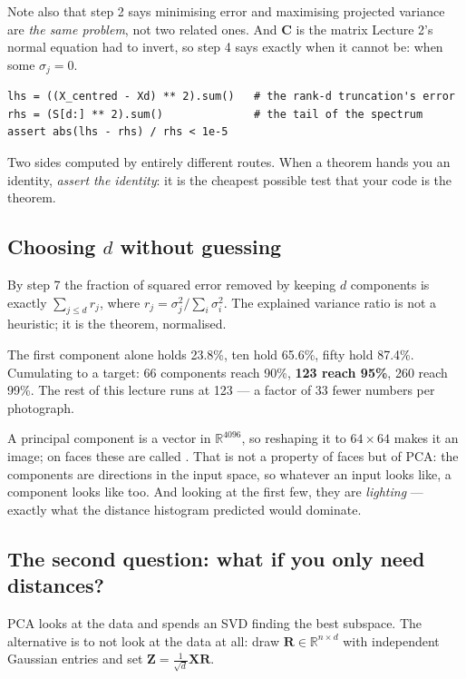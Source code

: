 \documentclass[11pt,a4paper]{article}
\begin{document}
Note also that step 2 says minimising error and maximising projected variance
are \emph{the same problem}, not two related ones. And $\mathbf{C}$ is the
matrix Lecture 2's normal equation had to invert, so step 4 says exactly when
it cannot be: when some $\sigma_j = 0$.

\begin{keybox}[title={A theorem you can check to machine precision}]
\begin{verbatim}
lhs = ((X_centred - Xd) ** 2).sum()   # the rank-d truncation's error
rhs = (S[d:] ** 2).sum()              # the tail of the spectrum
assert abs(lhs - rhs) / rhs < 1e-5
\end{verbatim}
Two sides computed by entirely different routes. When a theorem hands you an
identity, \emph{assert the identity}: it is the cheapest possible test that
your code is the theorem.
\end{keybox}

\subsection{Choosing $d$ without guessing}

By step 7 the fraction of squared error removed by keeping $d$ components is
exactly $\sum_{j\le d} r_j$, where $r_j = \sigma_j^2/\sum_i\sigma_i^2$. The
explained variance ratio is not a heuristic; it is the theorem, normalised.

The first component alone holds 23.8\%, ten hold 65.6\%, fifty hold 87.4\%.
Cumulating to a target: 66 components reach 90\%, \textbf{123 reach 95\%}, 260
reach 99\%. The rest of this lecture runs at 123 --- a factor of 33 fewer
numbers per photograph.

A principal component is a vector in $\mathbb{R}^{4096}$, so reshaping it to
$64\times64$ makes it an image; on faces these are called .
That is not a property of faces but of PCA: the components are directions in
the input space, so whatever an input looks like, a component looks like too.
And looking at the first few, they are \emph{lighting} --- exactly what the
distance histogram predicted would dominate.

\subsection{The second question: what if you only need distances?}

PCA looks at the data and spends an SVD finding the best subspace. The
alternative is to not look at the data at all: draw
$\mathbf{R} \in \mathbb{R}^{n\times d}$ with independent Gaussian entries and
set $\mathbf{Z} = \frac{1}{\sqrt d}\mathbf{X}\mathbf{R}$.
\end{document}
